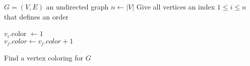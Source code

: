 \documentclass{article}
\begin{document}
\begin{preview}
    \begin{algorithm}[H]
        \begin{algorithmic}
            \Require $G = (V, E)$ an undirected graph
            \State $n \gets |V|$
            \State Give all vertices an index $1 \leq i \leq n$ that defines an order

                \State $v_i$.color $\gets 1$
            \EndFor
            \\
                        \State $v_j.color \gets v_j.color + 1$
                    \EndIf
                \EndFor
            \EndFor
        \end{algorithmic}
    \caption{Find a vertex coloring for $G$}
    \label{alg:vertexColoring}
    \end{algorithm}
\end{preview}
\end{document}

